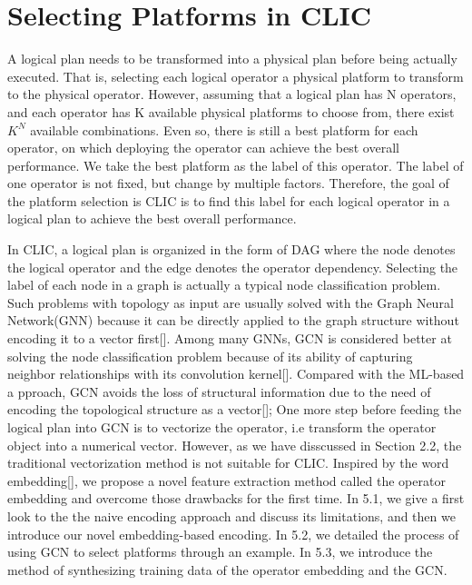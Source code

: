 
\section{Selecting Platforms in CLIC}

A logical plan needs to be transformed into a physical plan before being actually executed.
That is, selecting each logical operator a physical platform to transform to the physical operator.
However, assuming that a logical plan has N operators, and each operator has K available physical platforms to choose from, 
there exist $K^N$ available combinations.
Even so, there is still a best platform for each operator, on which deploying the operator can achieve the best overall performance. 
We take the best platform as the label of this operator.
The label of one operator is not fixed, but change by multiple factors.
Therefore, the goal of the platform selection is CLIC is to find this label for each logical operator in a logical plan to achieve the best overall performance.


In CLIC, a logical plan is organized in the form of DAG where the node denotes the logical operator and the edge denotes the operator dependency.
Selecting the label of each node in a graph is actually a typical node classification problem.
Such problems with topology as input are usually solved with the Graph Neural Network(GNN) because it can be directly applied to the graph structure without encoding it to a vector first[].
Among many GNNs, GCN is considered better at solving the node classification problem because of its ability of capturing neighbor relationships with its convolution kernel[].
Compared with the ML-based a pproach, GCN avoids the loss of structural information due to the need of encoding the topological structure as a vector[];
One more step before feeding the logical plan into GCN is to vectorize the operator, i.e transform the operator object into a numerical vector.
However, as we have disscussed in Section 2.2, the traditional vectorization method is not suitable for CLIC. 
Inspired by the word embedding[], we propose a novel feature extraction method called the operator embedding and overcome those drawbacks for the first time.
In 5.1, we give a first look to the the naive encoding approach and discuss its limitations, and then we introduce our novel embedding-based encoding.
In 5.2, we detailed the process of using GCN to select platforms through an example.
In 5.3, we introduce the method of synthesizing training data of the operator embedding and the GCN.


